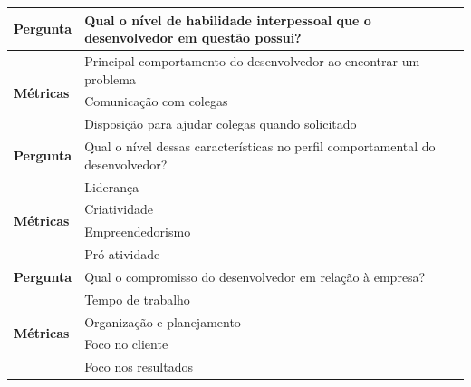 \begin{table}[h]
\begin{tabular}{|p{2cm}|p{6.25cm}|p{6.25cm}|}
		
		\textbf{Pergunta}                  & \multicolumn{2}{l|}{\parbox{12cm}{Qual o nível de habilidade interpessoal que o desenvolvedor em questão possui?}}     \\ \hline
		\multirow{3}{*}{\textbf{Métricas}} 
		& \multicolumn{2}{l|}{Principal comportamento do desenvolvedor ao encontrar um problema}                                                            \\ \cline{2-3} 
		& \multicolumn{2}{l|}{Comunicação com colegas}                                                            \\ \cline{2-3} 
		& \multicolumn{2}{l|}{Disposição para ajudar colegas quando solicitado}                                   \\ \hline\hline
		
		
		\textbf{Pergunta}                  & \multicolumn{2}{l|}{\parbox{12cm}{Qual o nível dessas características no perfil comportamental do desenvolvedor?}}     \\ \hline
		\multirow{4}{*}{\textbf{Métricas}} & \multicolumn{2}{l|}{Liderança}                                                                          \\ \cline{2-3} 
		& \multicolumn{2}{l|}{Criatividade}                                                                       \\ \cline{2-3} 
		& \multicolumn{2}{l|}{Empreendedorismo}                                                                   \\ \cline{2-3} 
		& \multicolumn{2}{l|}{Pró-atividade}                                                                      \\ \hline\hline
		
		
		\textbf{Pergunta}                  & \multicolumn{2}{l|}{\parbox{12cm}{Qual o compromisso do desenvolvedor em relação à empresa?}}                          \\ \hline
		\multirow{4}{*}{\textbf{Métricas}} & \multicolumn{2}{l|}{Tempo de trabalho}                                                                  \\ \cline{2-3} 
		& \multicolumn{2}{l|}{Organização e planejamento}                                                         \\ \cline{2-3} 
		& \multicolumn{2}{l|}{Foco no cliente}                                                                    \\ \cline{2-3} 
		& \multicolumn{2}{l|}{Foco nos resultados}                                                                \\ \hline
	\end{tabular}
\end{table}


